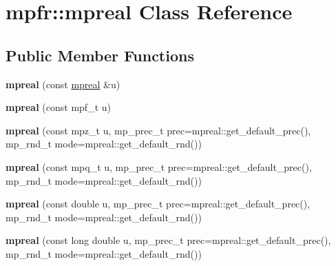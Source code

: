 \hypertarget{classmpfr_1_1mpreal}{}\section{mpfr\+:\+:mpreal Class Reference}
\label{classmpfr_1_1mpreal}
\subsection*{Public Member Functions}
\begin{DoxyCompactItemize}
\item 
\mbox{\label{classmpfr_1_1mpreal_a74b08628ebe3b25cb7e08d28bc87a42d}} 
{\bfseries mpreal} (const \hyperlink{classmpfr_1_1mpreal}{mpreal} \&u)
\item 
\mbox{\label{classmpfr_1_1mpreal_afc57c4273e1547f98db16b41bc304e14}} 
{\bfseries mpreal} (const mpf\+\_\+t u)
\item 
\mbox{\label{classmpfr_1_1mpreal_ad991d6226d8cdd978d743ceefa3969e5}} 
{\bfseries mpreal} (const mpz\+\_\+t u, mp\+\_\+prec\+\_\+t prec=mpreal\+::get\+\_\+default\+\_\+prec(), mp\+\_\+rnd\+\_\+t mode=mpreal\+::get\+\_\+default\+\_\+rnd())
\item 
\mbox{\label{classmpfr_1_1mpreal_af8647b1b46480b35ca71ca8b4e963471}} 
{\bfseries mpreal} (const mpq\+\_\+t u, mp\+\_\+prec\+\_\+t prec=mpreal\+::get\+\_\+default\+\_\+prec(), mp\+\_\+rnd\+\_\+t mode=mpreal\+::get\+\_\+default\+\_\+rnd())
\item 
\mbox{\label{classmpfr_1_1mpreal_a719c3d6efce9bf4edf605793b3017a9f}} 
{\bfseries mpreal} (const double u, mp\+\_\+prec\+\_\+t prec=mpreal\+::get\+\_\+default\+\_\+prec(), mp\+\_\+rnd\+\_\+t mode=mpreal\+::get\+\_\+default\+\_\+rnd())
\item 
\mbox{\label{classmpfr_1_1mpreal_aa32eb4b480368db0b153cee6a275edcd}} 
{\bfseries mpreal} (const long double u, mp\+\_\+prec\+\_\+t prec=mpreal\+::get\+\_\+default\+\_\+prec(), mp\+\_\+rnd\+\_\+t mode=mpreal\+::get\+\_\+default\+\_\+rnd())
\item 
\mbox{\label{classmpfr_1_1mpreal_abf092f1b26631d929a3bc8bc9366d5b7}} 

\end{DoxyCompactItemize}

